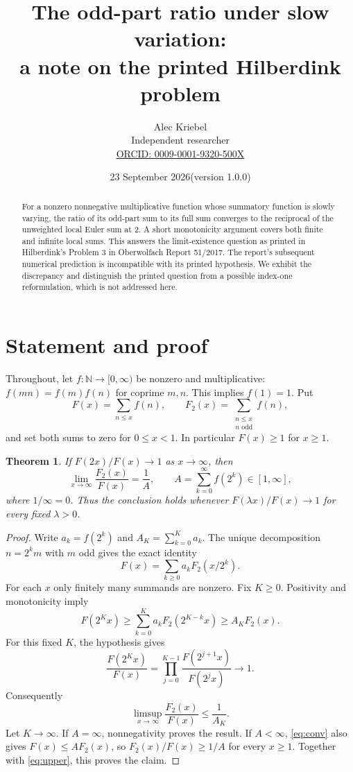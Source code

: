 \documentclass[11pt]{article}
\title{The odd-part ratio under slow variation:\\a note on the printed Hilberdink problem}
\author{Alec Kriebel\\\small Independent researcher\\\small\href{https://orcid.org/0009-0001-9320-500X}{ORCID: 0009-0001-9320-500X}}
\date{23 September 2026\quad(version 1.0.0)}
\newtheorem{theorem}{Theorem}
\begin{document}
\maketitle
\begin{abstract}
For a nonzero nonnegative multiplicative function whose summatory function is slowly varying, the ratio of its odd-part sum to its full sum converges to the reciprocal of the unweighted local Euler sum at 2. A short monotonicity argument covers both finite and infinite local sums. This answers the limit-existence question as printed in Hilberdink's Problem 3 in Oberwolfach Report 51/2017. The report's subsequent numerical prediction is incompatible with its printed hypothesis. We exhibit the discrepancy and distinguish the printed question from a possible index-one reformulation, which is not addressed here.
\end{abstract}

\section{Statement and proof}
Throughout, let $f:\mathbb N\to[0,\infty)$ be nonzero and multiplicative: $f(mn)=f(m)f(n)$ for coprime $m,n$. This implies $f(1)=1$. Put
\[
 F(x)=\sum_{n\le x}f(n),\qquad
 F_2(x)=\sum_{\substack{n\le x\\n\text{ odd}}}f(n),
\]
and set both sums to zero for $0\le x<1$. In particular $F(x)\ge1$ for $x\ge1$.

\begin{theorem}\label{thm:main}
If $F(2x)/F(x)\to1$ as $x\to\infty$, then
\[
 \lim_{x\to\infty}\frac{F_2(x)}{F(x)}
 =\frac1A,\qquad A=\sum_{k=0}^\infty f(2^k)\in[1,\infty],
\]
where $1/\infty=0$. Thus the conclusion holds whenever $F(\lambda x)/F(x)\to1$ for every fixed $\lambda>0$.
\end{theorem}
\begin{proof}
Write $a_k=f(2^k)$ and $A_K=\sum_{k=0}^K a_k$. The unique decomposition $n=2^k m$ with $m$ odd gives the exact identity
\begin{equation}\label{eq:conv}
 F(x)=\sum_{k\ge0}a_k F_2(x/2^k).
\end{equation}
For each $x$ only finitely many summands are nonzero. Fix $K\ge0$. Positivity and monotonicity imply
\[
 F(2^Kx)\ge\sum_{k=0}^K a_k F_2(2^{K-k}x)\ge A_KF_2(x).
\]
For this fixed $K$, the hypothesis gives
\[
 \frac{F(2^Kx)}{F(x)}
 =\prod_{j=0}^{K-1}\frac{F(2^{j+1}x)}{F(2^jx)}\longrightarrow1.
\]
Consequently
\begin{equation}\label{eq:upper}
 \limsup_{x\to\infty}\frac{F_2(x)}{F(x)}\le\frac1{A_K}.
\end{equation}
Let $K\to\infty$. If $A=\infty$, nonnegativity proves the result. If $A<\infty$, \eqref{eq:conv} also gives $F(x)\le AF_2(x)$, so $F_2(x)/F(x)\ge1/A$ for every $x\ge1$. Together with \eqref{eq:upper}, this proves the claim.
\end{proof}
\end{document}
